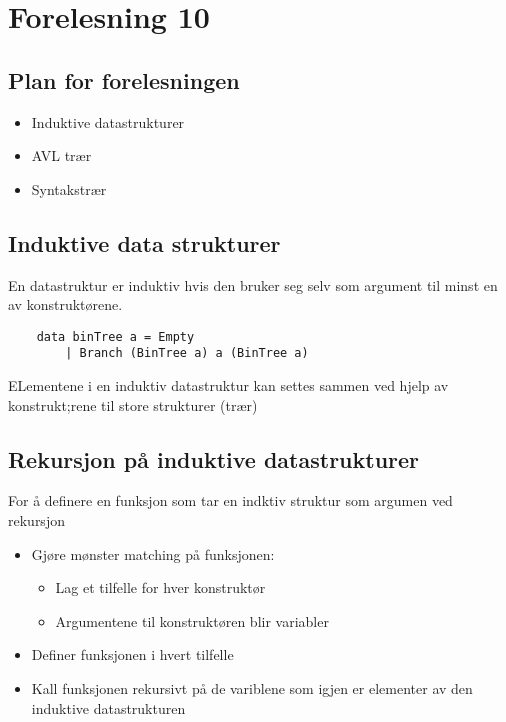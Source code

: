 \documentclass{article}
\begin{document}
    \section{Forelesning 10}

    \subsection{Plan for forelesningen}
    \begin{itemize}
        \item Induktive datastrukturer
        \item AVL trær
        \item Syntakstrær
    \end{itemize}

   \subsection{Induktive data strukturer}
   En datastruktur er induktiv hvis den bruker seg selv som argument til minst en av konstruktørene.

    \begin{lstlisting}
    data binTree a = Empty
        | Branch (BinTree a) a (BinTree a)
    \end{lstlisting}    

    ELementene i en induktiv datastruktur kan settes sammen ved hjelp av konstrukt;rene til store strukturer (trær)

    \subsection{Rekursjon på induktive datastrukturer}
    For å definere en funksjon som tar en indktiv struktur som argumen ved rekursjon

    \begin{itemize}
        \item Gjøre mønster matching på funksjonen:
            \begin{itemize}
                \item Lag et tilfelle for hver konstruktør
                \item Argumentene til konstruktøren blir variabler
            \end{itemize}
        \item Definer funksjonen i hvert tilfelle
        \item Kall funksjonen rekursivt på de variblene som igjen er elementer av den induktive datastrukturen
    \end{itemize}   
\end{document}
